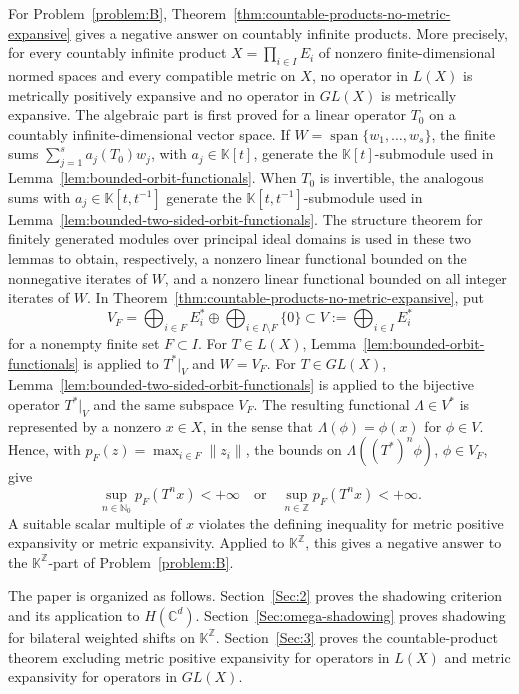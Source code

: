 \documentclass[11pt]{amsart}
\theoremstyle{definition}
\theoremstyle{remark}
\theoremstyle{plain}
\begin{document}
For Problem~\ref{problem:B},
Theorem~\ref{thm:countable-products-no-metric-expansive} gives a negative
answer on countably infinite products.  More precisely, for every countably
infinite product \(X=\prod_{i\in I}E_i\) of nonzero
finite-dimensional normed spaces and every compatible metric on \(X\), no
operator in \(L(X)\) is metrically positively expansive and no operator in
\(GL(X)\) is metrically expansive.  The algebraic part is first proved for a
linear operator \(T_0\) on a countably infinite-dimensional vector space.  If
\(W=\operatorname{span}\{w_1,\ldots,w_s\}\), the finite sums
\(\sum_{j=1}^s a_j(T_0)w_j\), with \(a_j\in\mathbb{K}[t]\), generate the
\(\mathbb{K}[t]\)-submodule used in
Lemma~\ref{lem:bounded-orbit-functionals}.  When \(T_0\) is invertible, the
analogous sums with \(a_j\in\mathbb{K}[t,t^{-1}]\) generate the
\(\mathbb{K}[t,t^{-1}]\)-submodule used in
Lemma~\ref{lem:bounded-two-sided-orbit-functionals}.  The structure theorem for
finitely generated modules over principal ideal domains is used in these two
lemmas to obtain, respectively, a nonzero linear functional bounded on the
nonnegative iterates of \(W\), and a nonzero linear functional bounded on all
integer iterates of \(W\).
In Theorem~\ref{thm:countable-products-no-metric-expansive}, put
\[
V_F=\bigoplus_{i\in F}E_i^*\oplus \bigoplus_{i\in I\setminus F}\{0\}
\subset V:=\bigoplus_{i\in I}E_i^*
\]
for a nonempty finite set \(F\subset I\).  For \(T\in L(X)\),
Lemma~\ref{lem:bounded-orbit-functionals} is applied to \(T^*|_V\) and
\(W=V_F\).  For \(T\in GL(X)\),
Lemma~\ref{lem:bounded-two-sided-orbit-functionals} is applied to the bijective
operator \(T^*|_V\) and the same subspace \(V_F\).  The resulting functional
\(\Lambda\in V^*\) is represented by a nonzero \(x\in X\), in the sense that
\(\Lambda(\phi)=\phi(x)\) for \(\phi\in V\).  Hence, with
\(p_F(z)=\max_{i\in F}\|z_i\|\), the bounds on
\(\Lambda((T^*)^n\phi)\), \(\phi\in V_F\), give
\[
\sup_{n\in\mathbb{N}_0}p_F(T^n x)<+\infty
\quad\text{or}\quad
\sup_{n\in\mathbb{Z}}p_F(T^n x)<+\infty .
\]
A suitable scalar multiple of \(x\) violates the defining inequality for
metric positive expansivity or metric expansivity.  Applied to
\(\mathbb{K}^{\mathbb{Z}}\), this gives a negative answer to the
\(\mathbb{K}^{\mathbb{Z}}\)-part of Problem~\ref{problem:B}.

The paper is organized as follows.  Section~\ref{Sec:2} proves the shadowing
criterion and its application to \(H(\mathbb{C}^d)\).  Section~\ref{Sec:omega-shadowing}
proves shadowing for bilateral weighted shifts on \(\mathbb{K}^{\mathbb{Z}}\).
Section~\ref{Sec:3} proves the countable-product theorem excluding metric
positive expansivity for operators in \(L(X)\) and metric expansivity for
operators in \(GL(X)\).
\end{document}
